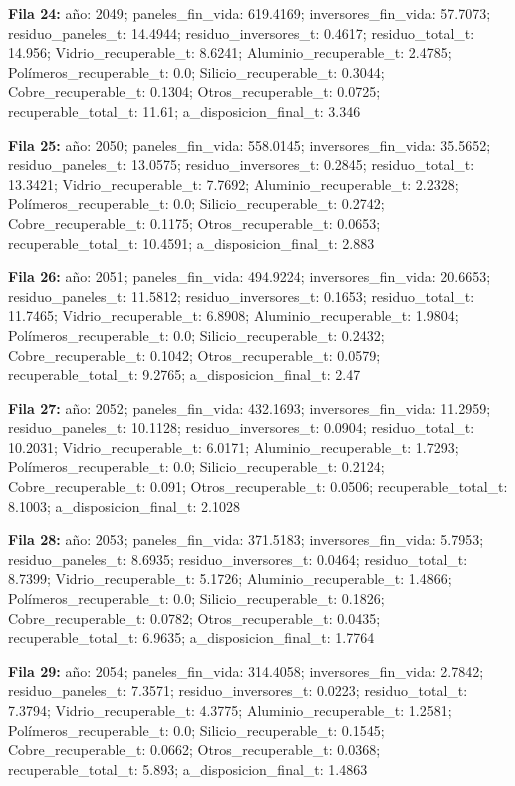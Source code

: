 {\footnotesize\textbf{Fila 24:} año: 2049; paneles\_fin\_vida: 619.4169; inversores\_fin\_vida: 57.7073; residuo\_paneles\_t: 14.4944; residuo\_inversores\_t: 0.4617; residuo\_total\_t: 14.956; Vidrio\_recuperable\_t: 8.6241; Aluminio\_recuperable\_t: 2.4785; Polímeros\_recuperable\_t: 0.0; Silicio\_recuperable\_t: 0.3044; Cobre\_recuperable\_t: 0.1304; Otros\_recuperable\_t: 0.0725; recuperable\_total\_t: 11.61; a\_disposicion\_final\_t: 3.346\par}
{\footnotesize\textbf{Fila 25:} año: 2050; paneles\_fin\_vida: 558.0145; inversores\_fin\_vida: 35.5652; residuo\_paneles\_t: 13.0575; residuo\_inversores\_t: 0.2845; residuo\_total\_t: 13.3421; Vidrio\_recuperable\_t: 7.7692; Aluminio\_recuperable\_t: 2.2328; Polímeros\_recuperable\_t: 0.0; Silicio\_recuperable\_t: 0.2742; Cobre\_recuperable\_t: 0.1175; Otros\_recuperable\_t: 0.0653; recuperable\_total\_t: 10.4591; a\_disposicion\_final\_t: 2.883\par}
{\footnotesize\textbf{Fila 26:} año: 2051; paneles\_fin\_vida: 494.9224; inversores\_fin\_vida: 20.6653; residuo\_paneles\_t: 11.5812; residuo\_inversores\_t: 0.1653; residuo\_total\_t: 11.7465; Vidrio\_recuperable\_t: 6.8908; Aluminio\_recuperable\_t: 1.9804; Polímeros\_recuperable\_t: 0.0; Silicio\_recuperable\_t: 0.2432; Cobre\_recuperable\_t: 0.1042; Otros\_recuperable\_t: 0.0579; recuperable\_total\_t: 9.2765; a\_disposicion\_final\_t: 2.47\par}
{\footnotesize\textbf{Fila 27:} año: 2052; paneles\_fin\_vida: 432.1693; inversores\_fin\_vida: 11.2959; residuo\_paneles\_t: 10.1128; residuo\_inversores\_t: 0.0904; residuo\_total\_t: 10.2031; Vidrio\_recuperable\_t: 6.0171; Aluminio\_recuperable\_t: 1.7293; Polímeros\_recuperable\_t: 0.0; Silicio\_recuperable\_t: 0.2124; Cobre\_recuperable\_t: 0.091; Otros\_recuperable\_t: 0.0506; recuperable\_total\_t: 8.1003; a\_disposicion\_final\_t: 2.1028\par}
{\footnotesize\textbf{Fila 28:} año: 2053; paneles\_fin\_vida: 371.5183; inversores\_fin\_vida: 5.7953; residuo\_paneles\_t: 8.6935; residuo\_inversores\_t: 0.0464; residuo\_total\_t: 8.7399; Vidrio\_recuperable\_t: 5.1726; Aluminio\_recuperable\_t: 1.4866; Polímeros\_recuperable\_t: 0.0; Silicio\_recuperable\_t: 0.1826; Cobre\_recuperable\_t: 0.0782; Otros\_recuperable\_t: 0.0435; recuperable\_total\_t: 6.9635; a\_disposicion\_final\_t: 1.7764\par}
{\footnotesize\textbf{Fila 29:} año: 2054; paneles\_fin\_vida: 314.4058; inversores\_fin\_vida: 2.7842; residuo\_paneles\_t: 7.3571; residuo\_inversores\_t: 0.0223; residuo\_total\_t: 7.3794; Vidrio\_recuperable\_t: 4.3775; Aluminio\_recuperable\_t: 1.2581; Polímeros\_recuperable\_t: 0.0; Silicio\_recuperable\_t: 0.1545; Cobre\_recuperable\_t: 0.0662; Otros\_recuperable\_t: 0.0368; recuperable\_total\_t: 5.893; a\_disposicion\_final\_t: 1.4863\par}
